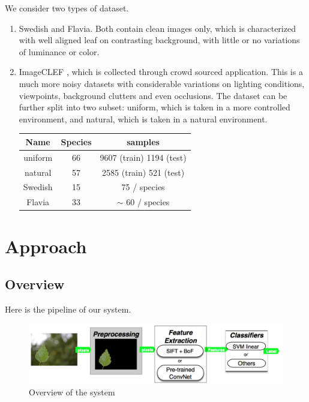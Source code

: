 \documentclass[journal, 10pt]{IEEEtran}
\begin{document}
    We consider two types of dataset.
\begin{enumerate}
  \item Swedish\cite{SwedishLeafDataset} and Flavia\cite{FlaviaDataset}. Both contain clean images only, which is characterized with well aligned leaf on contrasting background, with little or no variations of luminance or color. \\

  \item ImageCLEF \cite{ImageCLEF2013}, which is collected through crowd sourced application. This is a much more noisy datasets with considerable variations on lighting conditions, viewpoints, background clutters and even occlusions. The dataset can be further split into two subset: uniform, which is taken in a more controlled environment, and natural, which is taken in a natural environment.
  \begin{center}
      \begin{tabular}{| c | c | c |}
      \hline
      Name    & Species & samples                  \\ \hline
      uniform & 66      & 9607 (train) 1194 (test) \\ \hline
      natural & 57      & 2585 (train) 521  (test) \\ \hline
      Swedish & 15      & 75 / species             \\ \hline
      Flavia  & 33      & $\sim$ 60 / species      \\ \hline
      \end{tabular}
  \end{center}
\end{enumerate}

\section{Approach}

\subsection{Overview}
Here is the pipeline of our system.
\begin{figure}[H]
  \center
  \includegraphics[width=1.0\linewidth]{overview}
  \caption{ Overview of the system }
  \label{fig:pipeline}
\end{figure}
\end{document}
